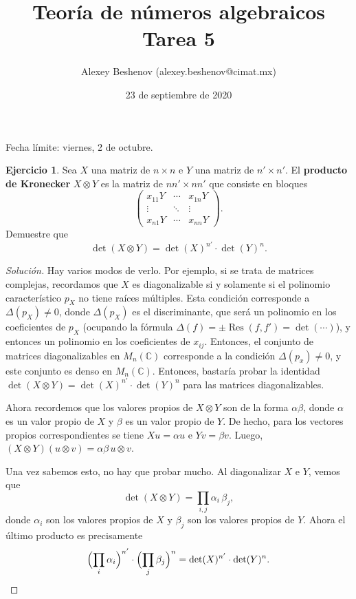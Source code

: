 \documentclass{article}
\title{Teoría de números algebraicos\\Tarea 5}
\author{Alexey Beshenov (alexey.beshenov@cimat.mx)}
\date{23 de septiembre de 2020}
\newcounter{tarea}
\theoremstyle{definition}
\newtheorem{ejercicio}{Ejercicio}[tarea]
\newenvironment{solucion}{\begin{proof}[Solución]}{\end{proof}}
\newcommand{\CC}{\mathbb{C}}
\DeclareMathOperator{\Res}{Res}
\begin{document}
{\sffamily\bfseries\maketitle}

\noindent Fecha límite: viernes, 2 de octubre.

\ifdefined\solutions
\else
\thispagestyle{empty}
\fi

\vspace{1em}

\begin{ejercicio}
  Sea $X$ una matriz de $n\times n$ e $Y$ una matriz de $n'\times n'$.
  El \textbf{producto de Kronecker} $X\otimes Y$ es la matriz de
  $nn' \times nn'$ que consiste en bloques
  \[ \begin{pmatrix}
    x_{11} Y & \cdots & x_{1n} Y \\
    \vdots & \ddots & \vdots \\
    x_{n1} Y & \cdots & x_{nn} Y
  \end{pmatrix}. \]
  Demuestre que
  $$\det (X\otimes Y) = \det (X)^{n'} \cdot \det (Y)^n.$$

  \ifdefined\solutions
  \begin{solucion}
    Hay varios modos de verlo. Por ejemplo, si se trata de matrices complejas,
    recordamos que $X$ es diagonalizable si y solamente si el polinomio
    característico $p_X$ no tiene raíces múltiples. Esta condición corresponde
    a $\Delta (p_X) \ne 0$, donde $\Delta (p_X)$ es el discriminante, que será
    un polinomio en los coeficientes de $p_X$ (ocupando la fórmula
    $\Delta (f) = \pm\Res (f,f') = \det (\cdots)$), y entonces un polinomio
    en los coeficientes de $x_{ij}$. Entonces, el conjunto de matrices
    diagonalizables en $M_n (\CC)$ corresponde a la condición
    $\Delta (p_x)\ne 0$, y este conjunto es denso en $M_n (\CC)$. Entonces,
    bastaría probar la identidad
    $\det (X\otimes Y) = \det (X)^{n'} \cdot \det (Y)^n$ para las matrices
    diagonalizables.

    Ahora recordemos que los valores propios de $X\otimes Y$ son de la forma
    $\alpha\beta$, donde $\alpha$ es un valor propio de $X$ y $\beta$ es un
    valor propio de $Y$. De hecho, para los vectores propios correspondientes
    se tiene $X u = \alpha u$ e $Y v = \beta v$. Luego,
    $(X\otimes Y) (u\otimes v) = \alpha\beta\,u\otimes v$.

    Una vez sabemos esto, no hay que probar mucho. Al diagonalizar $X$ e $Y$,
    vemos que
    $$\det (X\otimes Y) = \prod_{i,j} \alpha_i \, \beta_j,$$
    donde $\alpha_i$ son los valores propios de $X$ y $\beta_j$ son los valores
    propios de $Y$. Ahora el último producto es precisamente
    \[ \Bigl(\prod_i \alpha_i\Bigr)^{n'} \cdot \Bigl(\prod_j \beta_j\Bigr)^n
    = \det (X)^{n'} \cdot \det (Y)^n. \]


\end{solucion}
\end{ejercicio}
\end{document}
